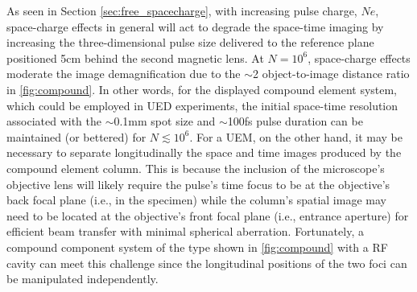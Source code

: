 As seen in Section \ref{sec:free_spacecharge}, with increasing pulse charge, $ N e $, space-charge effects in general will act to degrade the space-time imaging by increasing the three-dimensional pulse size delivered to the reference plane positioned 5cm behind the second magnetic lens.
At $ N = 10^{6} $, space-charge effects moderate the image demagnification due to the $\sim$2 object-to-image distance ratio in \ref{fig:compound}. 
In other words, for the displayed compound element system, which could be employed in UED experiments,\cite{oudheusden_electron_2007} the initial space-time resolution associated with the $\sim$0.1mm spot size and $\sim$100fs pulse duration can be maintained (or bettered) for $N \lesssim 10^{6} $.
For a UEM, on the other hand, it may be necessary to separate longitudinally the space and time images produced by the compound element column.
This is because the inclusion of the microscope's objective lens will likely require the pulse's time focus to be at the objective's back focal plane (i.e., in the specimen) while the column's spatial image may need to be located at the objective's front focal plane (i.e., entrance aperture) for efficient beam transfer with minimal spherical aberration.
Fortunately, a compound component system of the type shown in \ref{fig:compound} with a RF cavity can meet this challenge since the longitudinal positions of the two foci can be manipulated independently.


